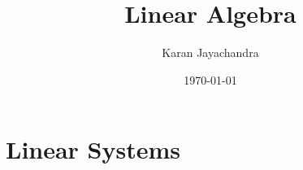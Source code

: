 \documentclass{book}
\title{Linear Algebra}
\author{Karan Jayachandra}
\date{\today}
\begin{document}
 
\maketitle
\tableofcontents
 
\mainmatter
\chapter{Linear Systems} 
\end{document}
